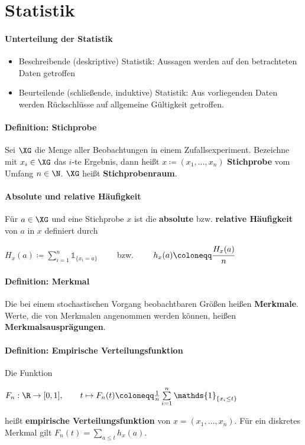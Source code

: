 \section{Statistik}
\paragraph{Unterteilung der Statistik}
\begin{itemize}
	\item Beschreibende (deskriptive) Statistik: Aussagen werden auf den betrachteten Daten getroffen
	\item Beurteilende (schließende, induktive) Statistik: Aus vorliegenden Daten werden Rückschlüsse auf allgemeine Gültigkeit getroffen.  
\end{itemize}
\paragraph{Definition: Stichprobe}
Sei $\XG$ die Menge aller Beobachtungen in einem Zufallsexperiment.
Bezeichne mit $x_i\in\XG$ das $i$-te Ergebnis, dann heißt $x\coloneqq(x_1,\ldots,x_n)$ \textbf{Stichprobe} vom Umfang $n\in\N$.
$\XG$ heißt \textbf{Stichprobenraum}.

\paragraph{Absolute und relative Häufigkeit}
Für $a\in\XG$ und eine Stichprobe $x$ ist die \textbf{absolute} bzw. \textbf{relative Häufigkeit} von $a$ in $x$ definiert durch
\begin{tightcenter}
	$H_x(a)\coloneqq\sum\limits_{i=1}^{n}\mathds{1}_{\{x_i=a\}}\qquad$ bzw. $\qquad h_x(a)\coloneqq\cfrac{H_x(a)}{n}$
\end{tightcenter}

\paragraph{Definition: Merkmal}
Die bei einem stochastischen Vorgang beobachtbaren Größen heißen \textbf{Merkmale}.
Werte, die von Merkmalen angenommen werden können, heißen \textbf{Merkmalsausprägungen}.

\paragraph{Definition: Empirische Verteilungsfunktion}
Die Funktion
\begin{tightcenter}
	$F_n:\R\rightarrow[0,1], \qquad t\mapsto F_n(t)\coloneqq\frac{1}{n}\sum\limits_{i=1}^{n}\mathds{1}_{\{x_i\leq t\}}$
\end{tightcenter}
heißt \textbf{empirische Verteilungsfunktion} von $x=(x_1,\ldots,x_n)$.
Für ein diskretes Merkmal gilt $F_n(t)=\sum_{a\leq t}h_x(a)$.


